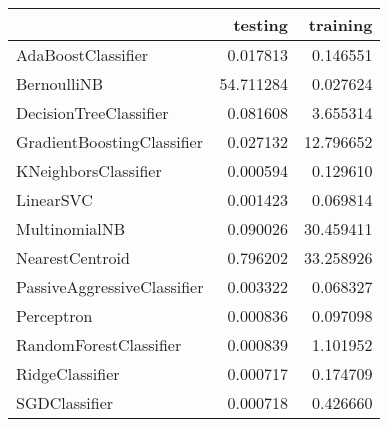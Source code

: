 \begin{tabular}{lrr}
\toprule
{} &    testing &   training \\
\midrule
AdaBoostClassifier          &   0.017813 &   0.146551 \\
BernoulliNB                 &  54.711284 &   0.027624 \\
DecisionTreeClassifier      &   0.081608 &   3.655314 \\
GradientBoostingClassifier  &   0.027132 &  12.796652 \\
KNeighborsClassifier        &   0.000594 &   0.129610 \\
LinearSVC                   &   0.001423 &   0.069814 \\
MultinomialNB               &   0.090026 &  30.459411 \\
NearestCentroid             &   0.796202 &  33.258926 \\
PassiveAggressiveClassifier &   0.003322 &   0.068327 \\
Perceptron                  &   0.000836 &   0.097098 \\
RandomForestClassifier      &   0.000839 &   1.101952 \\
RidgeClassifier             &   0.000717 &   0.174709 \\
SGDClassifier               &   0.000718 &   0.426660 \\
\bottomrule
\end{tabular}
